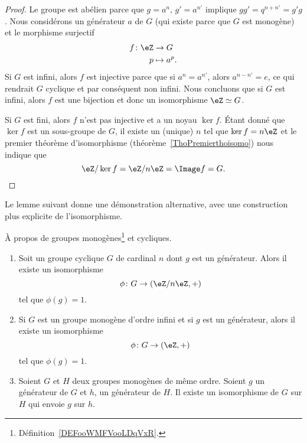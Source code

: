 \begin{proof}
	Le groupe est abélien parce que \( g=a^n\), \( g'=a^{n'}\) implique \( gg'=q^{n+n'}=g'g\). Nous considérons un générateur \( a\) de \( G\) (qui existe parce que \( G\) est monogène) et le morphisme surjectif
	\begin{equation}
		\begin{aligned}
			f\colon \eZ & \to G        \\
			p           & \mapsto a^p.
		\end{aligned}
	\end{equation}
	Si \( G\) est infini, alors \( f\) est injective parce que si \( a^n=a^{n'}\), alors \( a^{n-n'}=e\), ce qui rendrait \( G\) cyclique et par conséquent non infini. Nous concluons que si \( G\) est infini, alors \( f\) est une bijection et donc un isomorphisme \( \eZ\simeq G\).

	Si \( G\) est fini, alors \( f\) n'est pas injective et a un noyau \( \ker f\). Étant donné que \( \ker f\) est un sous-groupe de \( G\), il existe un (unique) \( n\) tel que \( \ker f=n\eZ\) et le premier théorème d'isomorphisme (théorème~\ref{ThoPremierthoisomo}) nous indique que
	\begin{equation}
		\eZ/\ker f=\eZ/n\eZ=\Image f=G.
	\end{equation}

\end{proof}

Le lemme suivant donne une démonstration alternative, avec une construction plus explicite de l'isomorphisme.

\begin{lemma}   \label{LemZhxMit}

    À propos de groupes monogènes\footnote{Définition~\ref{DEFooWMFVooLDqVxR}.} et cycliques.

	\begin{enumerate}
		\item

		      Soit un groupe cyclique \( G\) de cardinal \( n\) dont \( g\) est un générateur. Alors il existe un isomorphisme
		      \begin{equation}
			      \phi\colon G\to (\eZ/n\eZ,+)
		      \end{equation}
		      tel que \( \phi(g)=1\).

		\item

		      Si \( G\) est un groupe monogène d'ordre infini et si \( g\) est un générateur, alors il existe un isomorphisme
		      \begin{equation}
			      \phi\colon G\to (\eZ,+)
		      \end{equation}
		      tel que \( \phi(g)=1\).

		\item

		      Soient \( G\) et \( H\) deux groupes monogènes de même ordre. Soient \( g\) un générateur de \( G\) et \( h\), un générateur de \( H\). Il existe un isomorphisme de \( G\) sur \( H\) qui envoie \( g\) sur \( h\).
	\end{enumerate}
\end{lemma}

